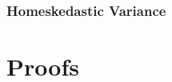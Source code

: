 \documentclass[
]{book}
\theoremstyle{definition}
\theoremstyle{definition}
\theoremstyle{definition}
\theoremstyle{definition}
\theoremstyle{remark}
\begin{document}
\hypertarget{homeskedastic-variance}{%
\subsection{Homeskedastic Variance}\label{homeskedastic-variance}}

\hypertarget{appendix-appendix}{%
\appendix}


\hypertarget{proofs}{%
\chapter{Proofs}\label{proofs}}

  
\end{document}
